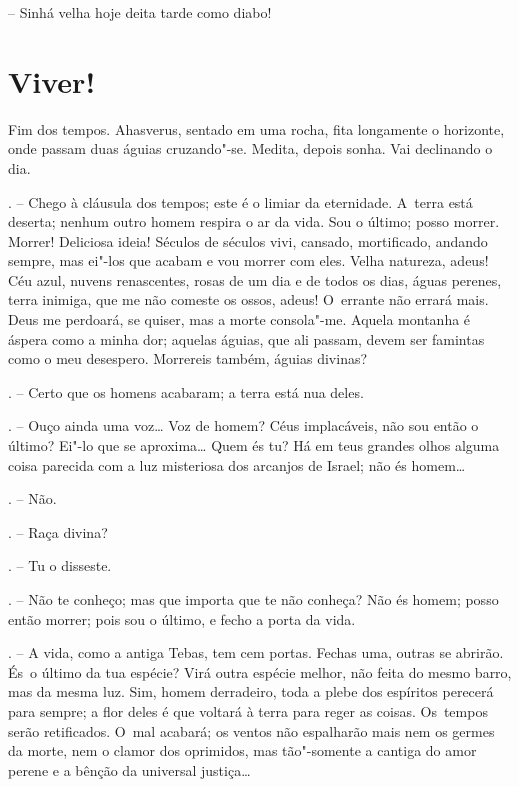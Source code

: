 -- Sinhá velha hoje deita tarde como diabo!

\chapter{Viver!}

Fim dos tempos. Ahasverus, sentado em uma rocha, fita longamente o
horizonte, onde passam duas águias cruzando"-se. Medita, depois sonha.
Vai declinando o dia.

\begin{Parskip}
. -- Chego à cláusula dos tempos; este é o limiar da
eternidade. A~terra está deserta; nenhum outro homem respira o ar da
vida. Sou o último; posso morrer. Morrer! Deliciosa ideia! Séculos de
séculos vivi, cansado, mortificado, andando sempre, mas ei"-los que
acabam e vou morrer com eles. Velha natureza, adeus! Céu azul, nuvens
renascentes, rosas de um dia e de todos os dias, águas perenes, terra
inimiga, que me não comeste os ossos, adeus! O~errante não errará mais.
Deus me perdoará, se quiser, mas a morte consola"-me. Aquela montanha é
áspera como a minha dor; aquelas águias, que ali passam, devem ser
famintas como o meu desespero. Morrereis também, águias divinas?

. -- Certo que os homens acabaram; a terra está nua deles.

. -- Ouço ainda uma voz\ldots{} Voz de homem? Céus implacáveis, não
sou então o último? Ei"-lo que se aproxima\ldots{} Quem és tu? Há em teus
grandes olhos alguma coisa parecida com a luz misteriosa dos arcanjos de
Israel; não és homem\ldots{}

. -- Não.

. -- Raça divina?

. -- Tu o disseste.

. -- Não te conheço; mas que importa que te não conheça? Não és
homem; posso então morrer; pois sou o último, e fecho a porta da vida.

. -- A vida, como a antiga Tebas, tem cem portas. Fechas uma,
outras se abrirão. És~o último da tua espécie? Virá outra espécie
melhor, não feita do mesmo barro, mas da mesma luz. Sim, homem
derradeiro, toda a plebe dos espíritos perecerá para sempre; a flor
deles é que voltará à terra para reger as coisas. Os~tempos serão
retificados. O~mal acabará; os ventos não espalharão mais nem os germes
da morte, nem o clamor dos oprimidos, mas tão"-somente a cantiga do amor
perene e a bênção da universal justiça\ldots{}


\end{Parskip}
